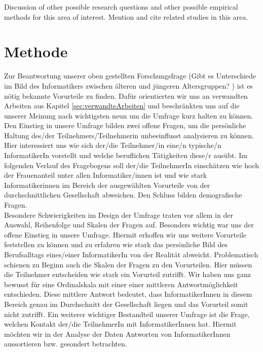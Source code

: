 \documentclass[de]{agse-empir-report}\usepackage[]{graphicx}\usepackage[]{color}
\begin{document}
Discussion of other possible research questions and other possible
empirical methods for this area of interest.
Mention and cite related studies in this area.

\lipsum[3]


\section[jk]{Methode}\label{sec:methode}

Zur Beantwortung unserer oben gestellten Forschungsfrage (\glqq Gibt es Unterschiede im Bild des Informatikers zwischen älteren und jüngeren Altersgruppen? \grqq) ist es nötig bekannte Vorurteile zu finden. Dafür orientierten wir uns an verwandten Arbeiten aus Kapitel \ref{sec:verwandteArbeiten}  und beschränkten uns auf die unserer Meinung nach wichtigsten neun um die Umfrage kurz halten zu können. Den Einstieg in unsere Umfrage bilden zwei offene Fragen, um die persönliche Haltung des/der Teilnehmers/Teilnehmerin unbeeinflusst analysieren zu können. Hier interessiert uns wie sich der/die Teilnehmer/in eine/n typische/n InformatikerIn vorstellt und welche beruflichen Tätigkeiten diese/r ausübt. Im folgenden Verlauf des Fragebogens soll der/die TeilnehmerIn einschätzen wie hoch der Frauenanteil unter allen Informatiker/innen ist und wie stark Informatikerinnen im Bereich der ausgewählten Vorurteile von der durchschnittlichen Gesellschaft abweichen. Den Schluss bilden demografische Fragen. \\
Besondere Schwierigkeiten im Design der Umfrage traten vor allem in der Auswahl, Reihenfolge und Skalen der Fragen auf. Besonders wichtig war uns der offene Einstieg in unsere Umfrage. Hiermit erhoffen wir uns weitere Vorurteile feststellen zu können und zu erfahren wie stark das persönliche Bild des Berufsalltags eines/einer InformatikerIn von der Realität abweicht. Problematisch schienen zu Beginn auch die Skalen der Fragen zu den Vorurteilen. Hier müssen die Teilnehmer entscheiden wie stark ein Vorurteil zutrifft. Wir haben uns ganz bewusst für eine Ordinalskala mit einer einer mittleren Antwortmöglichkeit entschieden. Diese mittlere Antwort bedeutet, dass InformatikerInnen in diesem Bereich genau im Durchschnitt der Gesellschaft liegen und das Vorurteil somit nicht zutrifft. Ein weiterer wichtiger Bestandteil unserer Umfrage ist die Frage, welchen Kontakt der/die TeilnehmerIn mit InformatikerInnen hat. Hiermit möchten wir in der Analyse der Daten Antworten von InformatikerInnen aussortieren bzw. gesondert betrachten. \\
\end{document}
